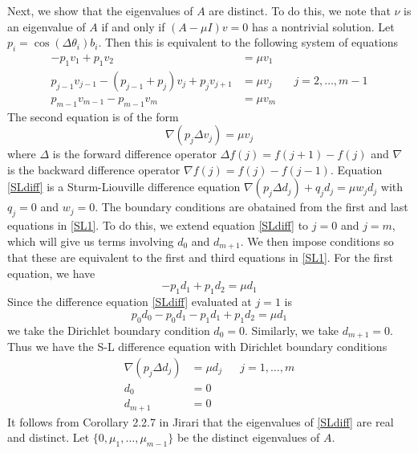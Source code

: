 \documentclass[12pt]{article}
\begin{document}
Next, we show that the eigenvalues of $A$ are distinct. To do this, we note that $\nu$ is an eigenvalue of $A$ if and only if $(A - \mu I)v = 0$ has a nontrivial solution. Let $p_i = \cos(\Delta\theta_i) b_i$. Then this is equivalent to the following system of equations
\begin{equation}\label{SL1}
\begin{aligned}
-p_1 v_1 + p_1 v_2 &= \mu v_1 \\
p_{j-1} v_{j-1} - (p_{j-1} + p_j)v_j + p_j v_{j+1} &= \mu v_j && j = 2, \dots, m-1 \\
p_{m-1} v_{m-1} - p_{m-1}v_m &= \mu v_m
\end{aligned}
\end{equation}
The second equation is of the form
\begin{equation}\label{SLdiff}
\nabla( p_j \Delta v_j ) = \mu v_j
\end{equation}
where $\Delta$ is the forward difference operator $\Delta f(j) = f(j+1) - f(j)$ and $\nabla$ is the backward difference operator $\nabla f(j) = f(j) - f(j-1)$. Equation \eqref{SLdiff} is a Sturm-Liouville difference equation $\nabla( p_j \Delta d_j ) + q_j d_j = \mu w_j d_j$ with $q_j = 0$ and $w_j = 0$. The boundary conditions are obatained from the first and last equations in \eqref{SL1}. To do this, we extend equation \eqref{SLdiff} to $j = 0$ and $j = m$, which will give us terms involving $d_0$ and $d_{m+1}$. We then impose conditions so that these are equivalent to the first and third equations in \eqref{SL1}. For the first equation, we have
\[
-p_1 d_1 + p_1 d_2 = \mu d_1
\]
Since the difference equation \eqref{SLdiff} evaluated at $j = 1$ is
\[
p_0 d_0 - p_0 d_1 - p_1 d_1 + p_1 d_2 = \mu d_1
\]
we take the Dirichlet boundary condition $d_0 = 0$. Similarly, we take $d_{m+1} = 0$. Thus we have the S-L difference equation with Dirichlet boundary conditions
\begin{equation}\label{SLdiff2}
\begin{aligned}
\nabla( p_j \Delta d_j ) &= \mu d_j && j = 1, \dots, m \\
d_0 &= 0 \\
d_{m+1} &= 0
\end{aligned}
\end{equation}
It follows from Corollary 2.2.7 in Jirari that the eigenvalues of \eqref{SLdiff} are real and distinct. Let $\{0, \mu_1, \dots, \mu_{m-1}\}$ be the distinct eigenvalues of $A$.
\end{document}
